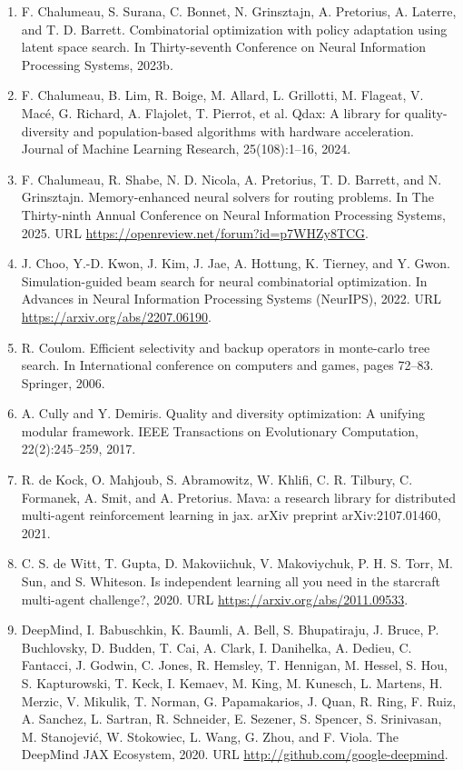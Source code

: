 \documentclass[11pt,UTF8,fontset=fandol]{ctexart}
\begin{document}
\begin{enumerate}[leftmargin=2em,itemsep=2pt]
\item F. Chalumeau, S. Surana, C. Bonnet, N. Grinsztajn, A. Pretorius, A. Laterre, and T. D. Barrett. Combinatorial optimization with policy adaptation using latent space search. In Thirty-seventh Conference on Neural Information Processing Systems, 2023b.
\item F. Chalumeau, B. Lim, R. Boige, M. Allard, L. Grillotti, M. Flageat, V. Mac\'e, G. Richard, A. Flajolet, T. Pierrot, et al. Qdax: A library for quality-diversity and population-based algorithms with hardware acceleration. Journal of Machine Learning Research, 25(108):1--16, 2024.
\item F. Chalumeau, R. Shabe, N. D. Nicola, A. Pretorius, T. D. Barrett, and N. Grinsztajn. Memory-enhanced neural solvers for routing problems. In The Thirty-ninth Annual Conference on Neural Information Processing Systems, 2025. URL \url{https://openreview.net/forum?id=p7WHZy8TCG}.
\item J. Choo, Y.-D. Kwon, J. Kim, J. Jae, A. Hottung, K. Tierney, and Y. Gwon. Simulation-guided beam search for neural combinatorial optimization. In Advances in Neural Information Processing Systems (NeurIPS), 2022. URL \url{https://arxiv.org/abs/2207.06190}.
\item R. Coulom. Efficient selectivity and backup operators in monte-carlo tree search. In International conference on computers and games, pages 72--83. Springer, 2006.
\item A. Cully and Y. Demiris. Quality and diversity optimization: A unifying modular framework. IEEE Transactions on Evolutionary Computation, 22(2):245--259, 2017.
\item R. de Kock, O. Mahjoub, S. Abramowitz, W. Khlifi, C. R. Tilbury, C. Formanek, A. Smit, and A. Pretorius. Mava: a research library for distributed multi-agent reinforcement learning in jax. arXiv preprint arXiv:2107.01460, 2021.
\item C. S. de Witt, T. Gupta, D. Makoviichuk, V. Makoviychuk, P. H. S. Torr, M. Sun, and S. Whiteson. Is independent learning all you need in the starcraft multi-agent challenge?, 2020. URL \url{https://arxiv.org/abs/2011.09533}.
\item DeepMind, I. Babuschkin, K. Baumli, A. Bell, S. Bhupatiraju, J. Bruce, P. Buchlovsky, D. Budden, T. Cai, A. Clark, I. Danihelka, A. Dedieu, C. Fantacci, J. Godwin, C. Jones, R. Hemsley, T. Hennigan, M. Hessel, S. Hou, S. Kapturowski, T. Keck, I. Kemaev, M. King, M. Kunesch, L. Martens, H. Merzic, V. Mikulik, T. Norman, G. Papamakarios, J. Quan, R. Ring, F. Ruiz, A. Sanchez, L. Sartran, R. Schneider, E. Sezener, S. Spencer, S. Srinivasan, M. Stanojevi\'c, W. Stokowiec, L. Wang, G. Zhou, and F. Viola. The DeepMind JAX Ecosystem, 2020. URL \url{http://github.com/google-deepmind}.

\end{enumerate}
\end{document}

